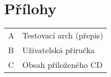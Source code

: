 \chapter*{Přílohy}   %
\thispagestyle{empty}   %
\begin{tabular}{ll}
A\qquad & Testovací arch (přepis)\\
B\qquad & Uživatelská příručka\\
C\qquad & Obsah přiloženého CD\\
\end{tabular}
